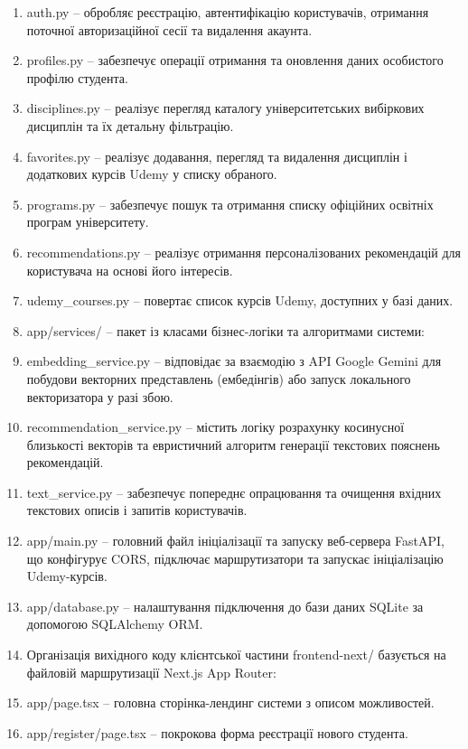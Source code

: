 \documentclass[
]{article}
\begin{document}
\begin{enumerate}
\def\labelenumi{\arabic{enumi}.}
\item
  auth.py -- обробляє реєстрацію, автентифікацію користувачів, отримання
  поточної авторизаційної сесії та видалення акаунта.
\item
  profiles.py -- забезпечує операції отримання та оновлення даних
  особистого профілю студента.
\item
  disciplines.py -- реалізує перегляд каталогу університетських
  вибіркових дисциплін та їх детальну фільтрацію.
\item
  favorites.py -- реалізує додавання, перегляд та видалення дисциплін і
  додаткових курсів Udemy у списку обраного.
\item
  programs.py -- забезпечує пошук та отримання списку офіційних освітніх
  програм університету.
\item
  recommendations.py -- реалізує отримання персоналізованих рекомендацій
  для користувача на основі його інтересів.
\item
  udemy\_courses.py -- повертає список курсів Udemy, доступних у базі
  даних.
\item
  app/services/ -- пакет із класами бізнес-логіки та алгоритмами
  системи:
\item
  embedding\_service.py -- відповідає за взаємодію з API Google Gemini
  для побудови векторних представлень (ембедінгів) або запуск локального
  векторизатора у разі збою.
\item
  recommendation\_service.py -- містить логіку розрахунку косинусної
  близькості векторів та евристичний алгоритм генерації текстових
  пояснень рекомендацій.
\item
  text\_service.py -- забезпечує попереднє опрацювання та очищення
  вхідних текстових описів і запитів користувачів.
\item
  app/main.py -- головний файл ініціалізації та запуску веб-сервера
  FastAPI, що конфігурує CORS, підключає маршрутизатори та запускає
  ініціалізацію Udemy-курсів.
\item
  app/database.py -- налаштування підключення до бази даних SQLite за
  допомогою SQLAlchemy ORM.
\item
  Організація вихідного коду клієнтської частини frontend-next/
  базується на файловій маршрутизації Next.js App Router:
\item
  app/page.tsx -- головна сторінка-лендинг системи з описом можливостей.
\item
  app/register/page.tsx -- покрокова форма реєстрації нового студента.

\end{enumerate}
\end{document}
